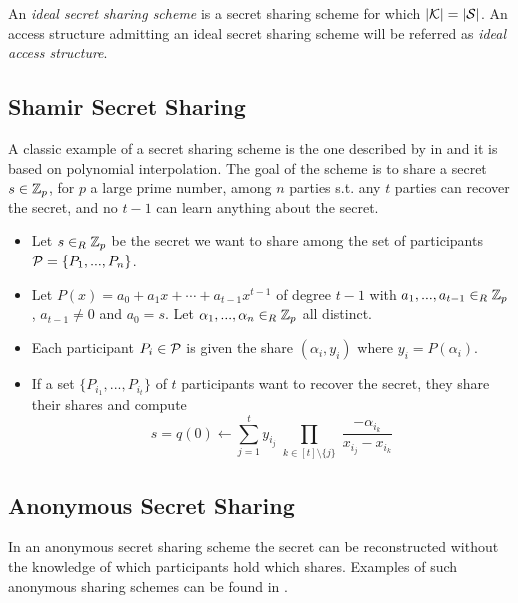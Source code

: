  An \textit{ideal secret sharing scheme} is a secret sharing scheme for which $\vert \mathcal{K} \vert = \vert \mathcal{S} \vert$. An access structure admitting an ideal secret sharing scheme will be referred as \textit{ideal access structure}.


\subsection{Shamir Secret Sharing}
A classic example of a secret sharing scheme is the one described by \citeauthor{Sham79} in \cite{Sham79} and it is based on polynomial interpolation. The goal of the scheme is to share a secret $s \in {\mathbb Z}_p$, for $p$ a large prime number, among $n$ parties s.t. any $t$ parties can recover the secret, and no $t-1$ can learn anything about the secret.

\begin{itemize}[align = left, leftmargin=*, label={--}]
\item Let $s \in_R {\mathbb Z}_p$ be the secret we want to share among the set of participants ${\mathcal P} = \{P_1, ... , P_n \}$.
\item Let $P(x) = a_0 + a_1 x + \cdots + a_{t-1} x^{t-1}$ of degree $t-1$ with $a_1, ..., a_{t-1} \in_R {\mathbb Z}_p$, $a_{t-1} \neq 0$ and $a_0 = s$. Let $\alpha_1, ... , \alpha_n \in_R {\mathbb Z}_p$ all distinct.
\item Each participant $P_i \in {\mathcal P}$ is given the share $(\alpha_i, y_i)$ where $y_i = P(\alpha_i)$.
\item If a set $\{P_{i_1},...,P_{i_t}\}$ of $t$ participants want to recover the secret, they share their shares and compute
$$ s = q(0) \leftarrow \sum_{j=1}^t y_{i_j} \prod_{\substack{k \in [t] \setminus \{j\}}} \frac{-\alpha_{i_k}}{x_{i_j}-x_{i_k}}$$
\end{itemize}

\subsection{Anonymous Secret Sharing}
In an anonymous secret sharing scheme the secret can be reconstructed without the knowledge of which participants hold which shares. Examples of such anonymous sharing schemes can be found in \cite{BlSt97}.

